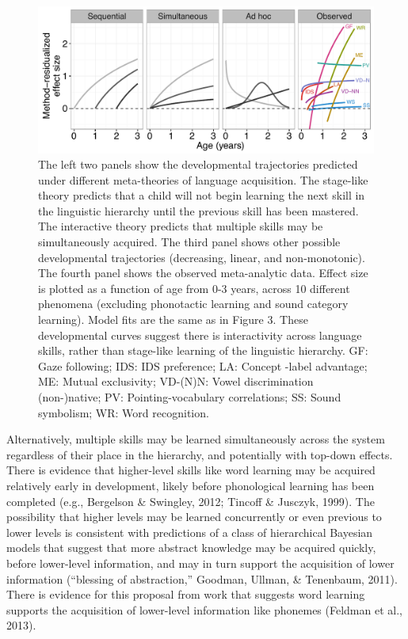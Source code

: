 \documentclass[english,floatsintext,man]{apa6}
\theoremstyle{definition}
\theoremstyle{definition}
\theoremstyle{remark}
\begin{document}
\begin{figure}
\centering
\includegraphics{figs/fig4_lab.pdf}
\caption{\label{fig:unnamed-chunk-6}The left two panels show the
developmental trajectories predicted under different meta-theories of
language acquisition. The stage-like theory predicts that a child will
not begin learning the next skill in the linguistic hierarchy until the
previous skill has been mastered. The interactive theory predicts that
multiple skills may be simultaneously acquired. The third panel shows
other possible developmental trajectories (decreasing, linear, and
non-monotonic). The fourth panel shows the observed meta-analytic data.
Effect size is plotted as a function of age from 0-3 years, across 10
different phenomena (excluding phonotactic learning and sound category
learning). Model fits are the same as in Figure 3. These developmental
curves suggest there is interactivity across language skills, rather
than stage-like learning of the linguistic hierarchy. GF: Gaze
following; IDS: IDS preference; LA: Concept -label advantage; ME: Mutual
exclusivity; VD-(N)N: Vowel discrimination (non-)native; PV:
Pointing-vocabulary correlations; SS: Sound symbolism; WR: Word
recognition.}
\end{figure}

Alternatively, multiple skills may be learned simultaneously across the
system regardless of their place in the hierarchy, and potentially with
top-down effects. There is evidence that higher-level skills like word
learning may be acquired relatively early in development, likely before
phonological learning has been completed (e.g., Bergelson \& Swingley,
2012; Tincoff \& Jusczyk, 1999). The possibility that higher levels may
be learned concurrently or even previous to lower levels is consistent
with predictions of a class of hierarchical Bayesian models that suggest
that more abstract knowledge may be acquired quickly, before lower-level
information, and may in turn support the acquisition of lower
information (``blessing of abstraction,'' Goodman, Ullman, \& Tenenbaum,
2011). There is evidence for this proposal from work that suggests word
learning supports the acquisition of lower-level information like
phonemes (Feldman et al., 2013).
\end{document}
